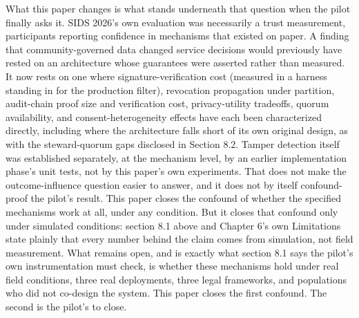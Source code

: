 What this paper changes is what stands underneath that question when the pilot finally asks it. SIDS 2026's own evaluation was necessarily a trust measurement, participants reporting confidence in mechanisms that existed on paper. A finding that community-governed data changed service decisions would previously have rested on an architecture whose guarantees were asserted rather than measured. It now rests on one where signature-verification cost (measured in a harness standing in for the production filter), revocation propagation under partition, audit-chain proof size and verification cost, privacy-utility tradeoffs, quorum availability, and consent-heterogeneity effects have each been characterized directly, including where the architecture falls short of its own original design, as with the steward-quorum gaps disclosed in Section 8.2. Tamper detection itself was established separately, at the mechanism level, by an earlier implementation phase's unit tests, not by this paper's own experiments. That does not make the outcome-influence question easier to answer, and it does not by itself confound-proof the pilot's result. This paper closes the confound of whether the specified mechanisms work at all, under any condition. But it closes that confound only under simulated conditions: section 8.1 above and Chapter 6's own Limitations state plainly that every number behind the claim comes from simulation, not field measurement. What remains open, and is exactly what section 8.1 says the pilot's own instrumentation must check, is whether these mechanisms hold under real field conditions, three real deployments, three legal frameworks, and populations who did not co-design the system. This paper closes the first confound. The second is the pilot's to close.
